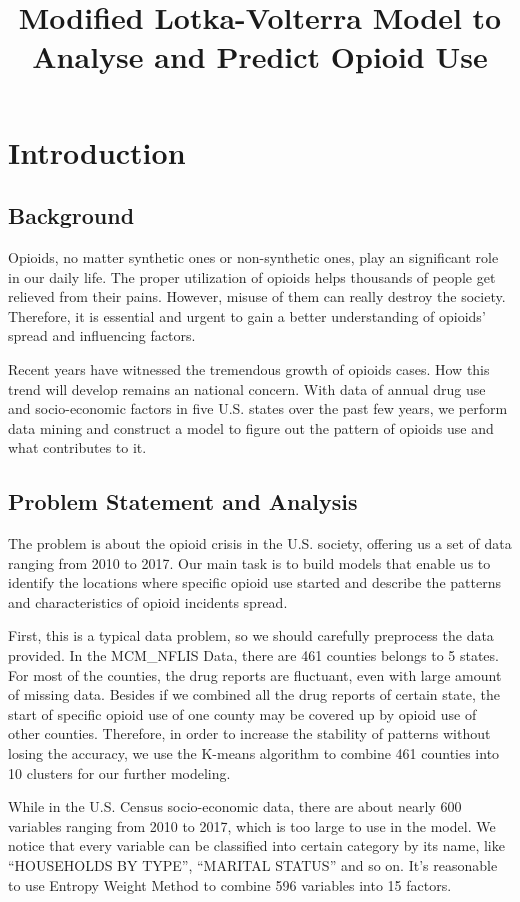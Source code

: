 \documentclass[12pt]{article}
\title{\large Modified Lotka-Volterra Model to Analyse and Predict Opioid Use}  %
\begin{document}

\section{Introduction}
\subsection{Background}
Opioids, no matter synthetic ones or non-synthetic ones, play an significant role in our daily life. The proper utilization of opioids helps thousands of people get relieved from their pains. However, misuse of them can really destroy the society. Therefore, it is essential and urgent to gain a better understanding of opioids' spread and influencing factors.

Recent years have witnessed the tremendous growth of opioids cases. How this trend will develop remains an national concern. With data of annual drug use and socio-economic factors in five U.S. states over the past few years, we perform data mining and construct a model to figure out the pattern of opioids use and what contributes to it.

\subsection{Problem Statement and Analysis}
The problem is about the opioid crisis in the U.S. society, offering us a set of data ranging from 2010 to 2017. Our main task is to build models that enable us to identify the locations where specific opioid use started and describe the patterns and characteristics of opioid incidents spread. 

First, this is a typical data problem, so we should carefully preprocess the data provided. In the MCM\_NFLIS Data, there are 461 counties belongs to 5 states. For most of the counties, the drug reports are fluctuant, even with large amount of missing data. Besides if we combined all the drug reports of certain state, the start of specific opioid use of one county may be covered up by opioid use of other counties. Therefore, in order to increase the stability of patterns without losing the accuracy, we use the K-means algorithm to combine 461 counties into 10 clusters for our further modeling.

While in the U.S. Census socio-economic data, there are about nearly 600 variables ranging from 2010 to 2017, which is too large to use in the model. We notice that every variable can be classified into certain category by its name, like “HOUSEHOLDS BY TYPE”, “MARITAL STATUS” and so on. It's reasonable to use Entropy Weight Method to combine 596 variables into 15 factors.
\end{document}

